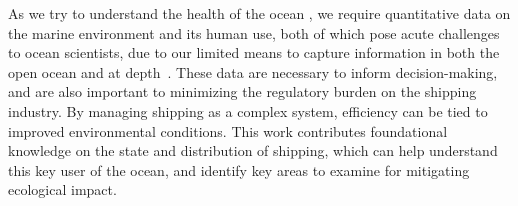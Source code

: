 


As we try to understand the health of the ocean \citep{Halpern2012}, we require quantitative data on the marine environment and its human use, both of which pose acute challenges to ocean scientists, due to our limited means to capture information in both the open ocean and at depth~\citep{Wright1997}. These data are necessary to inform decision-making, and are also important to minimizing the regulatory burden on the shipping industry. By managing shipping as a complex system, efficiency can be tied to improved environmental conditions. This work contributes foundational knowledge on the state and distribution of shipping, which can help understand this key user of the ocean, and identify key areas to examine for mitigating ecological impact.






